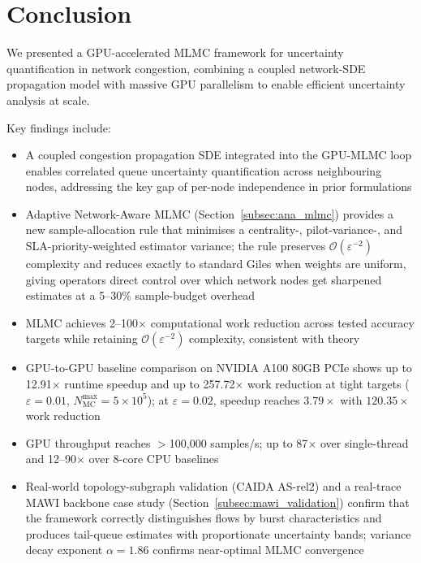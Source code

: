 \documentclass{ieeeaccess}
\begin{document}
\section{Conclusion}

We presented a GPU-accelerated MLMC framework for uncertainty quantification in network
congestion, combining a coupled network-SDE propagation model with massive GPU parallelism to
enable efficient uncertainty analysis at scale.

Key findings include:
\begin{itemize}
    \item A coupled congestion propagation SDE integrated into the GPU-MLMC loop enables
    correlated queue uncertainty quantification across neighbouring nodes, addressing the key gap
    of per-node independence in prior formulations
    \item Adaptive Network-Aware MLMC (Section~\ref{subsec:ana_mlmc}) provides a new
    sample-allocation rule that minimises a centrality-, pilot-variance-, and
    SLA-priority-weighted estimator variance; the rule preserves $\mathcal{O}(\varepsilon^{-2})$
    complexity and reduces exactly to standard Giles when weights are uniform, giving operators
    direct control over which network nodes get sharpened estimates at a 5--30\% sample-budget
    overhead
    \item MLMC achieves 2--100$\times$ computational work reduction across tested accuracy
    targets while retaining $\mathcal{O}(\varepsilon^{-2})$ complexity, consistent with theory
    \cite{giles2015multilevel}
    \item GPU-to-GPU baseline comparison on NVIDIA A100 80GB PCIe shows up to 12.91$\times$
    runtime speedup and up to 257.72$\times$ work reduction at tight targets ($\varepsilon=0.01$,
    $N_\text{MC}^\text{max}=5\times10^5$); at $\varepsilon=0.02$, speedup reaches $3.79\times$
    with $120.35\times$ work reduction
    \item GPU throughput reaches $>$100,000 samples/s; up to 87$\times$ over single-thread and
    12--90$\times$ over 8-core CPU baselines
    \item Real-world topology-subgraph validation (CAIDA AS-rel2) and a real-trace MAWI backbone
    case study (Section~\ref{subsec:mawi_validation}) confirm that the framework correctly
    distinguishes flows by burst characteristics and produces tail-queue estimates with
    proportionate uncertainty bands; variance decay exponent $\alpha = 1.86$ confirms near-optimal
    MLMC convergence
\end{itemize}
\end{document}
